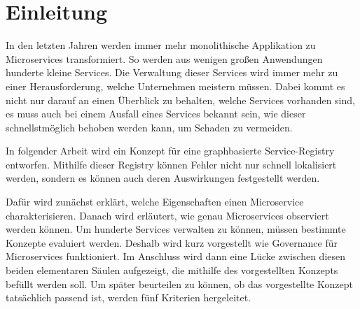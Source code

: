 \documentclass[
	12pt,
	BCOR=5mm,
	DIV=12,
	headinclude=on,
	footinclude=off,
	parskip=half,
	bibliography=totoc,
	listof=entryprefix,
	toc=listof,
	numbers=noenddot,
	plainfootsepline
]{scrreprt}
\begin{document}






\normalfont



\tableofcontents

\listoffigures

\listoftables




\clearpage
\ihead{\chaptername~\thechapter}
\ohead{\headmark}


\chapter{Einleitung}

In den letzten Jahren werden immer mehr monolithische Applikation zu Microservices transformiert. So werden aus wenigen großen Anwendungen hunderte kleine Services. Die Verwaltung dieser Services wird immer mehr zu einer Herausforderung, welche Unternehmen meistern müssen. Dabei kommt es nicht nur darauf an einen Überblick zu behalten, welche Services vorhanden sind, es muss auch bei einem Ausfall eines Services bekannt sein, wie dieser schnellstmöglich behoben werden kann, um Schaden zu vermeiden. 

In folgender Arbeit wird ein Konzept für eine graphbasierte Service-Registry entworfen. Mithilfe dieser Registry können Fehler nicht nur schnell lokalisiert werden, sondern es können auch deren Auswirkungen festgestellt werden.

Dafür wird zunächst erklärt, welche Eigenschaften einen Microservice charakterisieren. Danach wird erläutert, wie genau Microservices observiert werden können. Um hunderte Services verwalten zu können, müssen bestimmte Konzepte evaluiert werden. Deshalb wird kurz vorgestellt wie Governance für Microservices funktioniert. Im Anschluss wird dann eine Lücke zwischen diesen beiden elementaren Säulen aufgezeigt, die mithilfe des vorgestellten Konzepts befüllt werden soll. Um später beurteilen zu können, ob das vorgestellte Konzept tatsächlich passend ist, werden fünf Kriterien hergeleitet.
\end{document}

